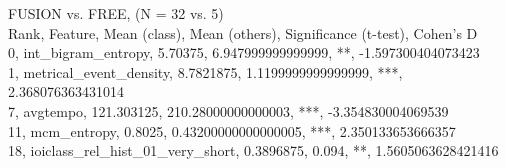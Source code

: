 FUSION vs. FREE, (N = 32 vs. 5)\\
Rank, Feature, Mean (class), Mean (others), Significance (t-test), Cohen's D\\
0, int_bigram_entropy, 5.70375, 6.947999999999999, **, -1.597300404073423\\
1, metrical_event_density, 8.7821875, 1.1199999999999999, ***, 2.368076363431014\\
7, avgtempo, 121.303125, 210.28000000000003, ***, -3.354830004069539\\
11, mcm_entropy, 0.8025, 0.43200000000000005, ***, 2.350133653666357\\
18, ioiclass_rel_hist_01_very_short, 0.3896875, 0.094, **, 1.5605063628421416\\
